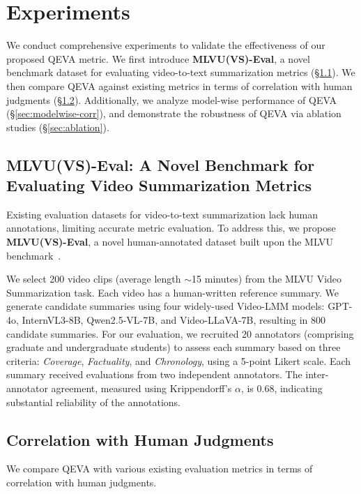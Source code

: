 


\section{Experiments}
\label{sec:experiments}

We conduct comprehensive experiments to validate the effectiveness of our proposed QEVA metric. We first introduce \textbf{MLVU(VS)-Eval}, a novel benchmark dataset for evaluating video-to-text summarization metrics (\S\ref{sec:dataset}). We then compare QEVA against existing metrics in terms of correlation with human judgments (\S\ref{sec:correlation}). Additionally, we analyze model-wise performance of QEVA (\S\ref{sec:modelwise-corr}), and demonstrate the robustness of QEVA via ablation studies (\S\ref{sec:ablation}).

\subsection{MLVU(VS)-Eval: A Novel Benchmark for Evaluating Video Summarization Metrics} \label{sec:dataset}

Existing evaluation datasets for video-to-text summarization lack human annotations, limiting accurate metric evaluation. To address this, we propose \textbf{MLVU(VS)-Eval}, a novel human-annotated dataset built upon the MLVU benchmark~\citep{zhou2024mlvu}.

We select 200 video clips (average length $\sim$15 minutes) from the MLVU Video Summarization task. Each video has a human-written reference summary. We generate candidate summaries using four widely-used Video-LMM models: GPT-4o, InternVL3-8B, Qwen2.5-VL-7B, and Video-LLaVA-7B, resulting in 800 candidate summaries. For our evaluation, we recruited 20 annotators (comprising graduate and undergraduate students) to assess each summary based on three criteria: \textit{Coverage}, \textit{Factuality}, and \textit{Chronology}, using a 5-point Likert scale. Each summary received evaluations from two independent annotators. The inter-annotator agreement, measured using Krippendorff's $\alpha$, is 0.68, indicating substantial reliability of the annotations.

\subsection{Correlation with Human Judgments} \label{sec:correlation}

We compare QEVA with various existing evaluation metrics in terms of correlation with human judgments.


